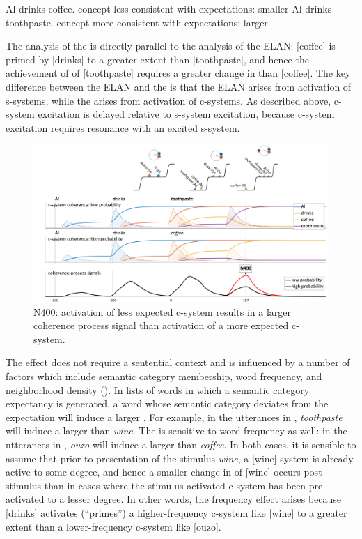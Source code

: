 \ea\label{ex:6:24}
\ea\label{ex:6:24a} Al drinks coffee. \hspace{3mm} concept less consistent with expectations: smaller 
\ex\label{ex:6:24b} Al drinks toothpaste. \hspace{3mm} concept more consistent with expectations: larger 
\z
\z

The analysis of the  is directly parallel to the analysis of the ELAN: [coffee] is primed by [drinks] to a greater extent than [toothpaste], and hence the achievement of  of [toothpaste] requires a greater change in  than [coffee]. The key difference between the ELAN and the  is that the ELAN arises from activation of s-systems, while the  arises from activation of c-systems. As described above, c-system excitation is delayed relative to s-system excitation, because c-system excitation requires resonance with an excited s-system.

  
\begin{figure}
\includegraphics[width=\textwidth]{figures/Tilsen-img143.png}
\caption{N400: activation of less expected c-system results in a larger coherence process signal than activation of a more expected c-system.}
\label{fig:6:24}
\end{figure}
 

The  effect does not require a sentential context and is influenced by a number of factors which include semantic category membership, word frequency, and neighborhood density (\citealt{KutasFedermeier2011,LauEtAl2008}). In lists of words in which a semantic category expectancy is generated, a word whose semantic category deviates from the expectation will induce a larger . For example, in the utterances in , \textit{toothpaste} will induce a larger  than \textit{wine}. The  is sensitive to word frequency as well: in the utterances in , \textit{ouzo} will induce a larger  than \textit{coffee}. In both cases, it is sensible to assume that prior to presentation of the stimulus \textit{wine}, a [wine] system is already active to some degree, and hence a smaller change in  of [wine] occurs post-stimulus than in cases where the stimulus-activated c-system has been pre-activated to a lesser degree. In other words, the frequency effect arises because [drinks] activates (“primes”) a higher-frequency c-system like [wine] to a greater extent than a lower-frequency c-system like [ouzo].

